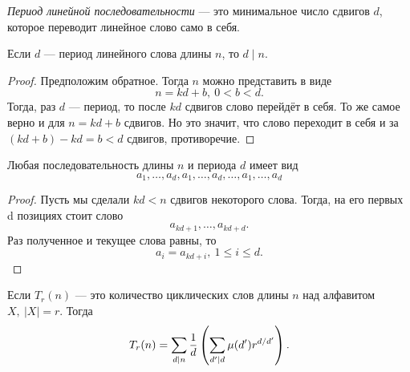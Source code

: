 \begin{definition}
	\textit{Период линейной последовательности} --- это минимальное число сдвигов $d$, которое переводит линейное слово само в себя.
\end{definition}

\begin{lemma}
	Если $d$ --- период линейного слова длины $n$, то $d \mid n$.
\end{lemma}

\begin{proof}
	Предположим обратное. Тогда $n$ можно представить в виде
	\[
		n = kd + b,\ 0 < b < d.
	\]
	Тогда, раз $d$ --- период, то после $kd$ сдвигов слово перейдёт в себя. То же самое верно и для $n = kd + b$ сдвигов. Но это значит, что слово переходит в себя и за $(kd + b) - kd = b < d$ сдвигов, противоречие.
\end{proof}

\begin{lemma}
	Любая последовательность длины $n$ и периода $d$ имеет вид
	\[
		a_1, \ldots, a_d, a_1, \ldots, a_d, \ldots, a_1, \ldots, a_d
	\]
\end{lemma}

\begin{proof}
	Пусть мы сделали $kd < n$ сдвигов некоторого слова. Тогда, на его первых d позициях стоит слово
	\[
		a_{kd + 1}, \ldots, a_{kd + d}.
	\]
	Раз полученное и текущее слова равны, то
	\[
		a_i = a_{kd + i},\ 1 \le i \le d.
	\]
\end{proof}

\begin{theorem}
	Если $T_r(n)$ --- это количество циклических слов длины $n$ над алфавитом $X,\ |X| = r$. Тогда
	\[
		T_r(n) = \sum\limits_{d \mid n} \frac{1}{d} \left(\sum\limits_{d' \mid d} \mu(d') r^{d / d'}\right).
	\]
\end{theorem}
